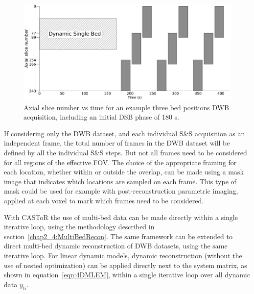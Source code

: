 \begin{figure} [h!]
\centering
\includegraphics[scale=0.28,angle=0]{3_Results/3_3_DWB_Reconstruction/figures/CompleteProtocolTiming.pdf}
\caption{Axial slice number vs time for an example three bed positions DWB acquisition, including an initial DSB phase of 180 s.}
\label{fig_3_3:CompleteProtocolFraming}
\end{figure} 

If considering only the DWB dataset, and each individual S\&S acquisition as an independent frame, the total number of frames in the DWB dataset will be defined by all the individual S\&S steps.
But not all frames need to be considered for all regions of the effective FOV. 
The choice of the appropriate framing for each location, whether within or outside the overlap, can be made using a mask image that indicates which locations are sampled on each frame. This type of mask could be used for example with post-reconstruction parametric imaging, applied at each voxel to mark which frames need to be considered.

With CASToR the use of multi-bed data can be made directly within a single iterative loop, using the methodology described in section~\ref{chap2_4:MultiBedRecon}. The same framework can be extended to direct multi-bed dynamic reconstruction of DWB datasets, using the same iterative loop. 
For linear dynamic models, dynamic reconstruction (without the use of nested optimization) can be applied directly next to the system matrix, as shown in equation~\ref{eqn:4DMLEM}, within a single iterative loop over all dynamic data $y_{ti}$. 

